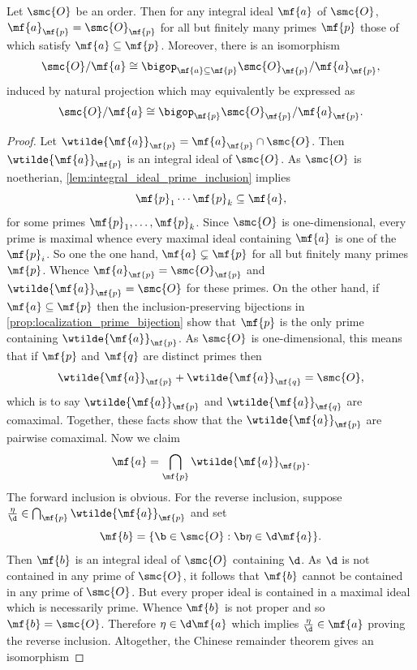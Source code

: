 \documentclass[12pt]{article}
\begin{document}
      \begin{proposition}\label{prop:localized_Chinese_remainder_theorem}
        Let \(\smc{O}\) be an order. Then for any integral ideal \(\mf{a}\) of \(\smc{O}\), \(\mf{a}_{\mf{p}} = \smc{O}_{\mf{p}}\) for all but finitely many primes \(\mf{p}\) those of which satisfy \(\mf{a} \subseteq \mf{p}\). Moreover, there is an isomorphism
        \[
          \smc{O}/\mf{a} \cong \bigop_{\mf{a} \subseteq \mf{p}}\smc{O}_{\mf{p}}/\mf{a}_{\mf{p}},
        \]
        induced by natural projection which may equivalently be expressed as
        \[
          \smc{O}/\mf{a} \cong \bigop_{\mf{p}}\smc{O}_{\mf{p}}/\mf{a}_{\mf{p}}.
        \]
      \end{proposition}
      \begin{proof}
        Let \(\wtilde{\mf{a}}_{\mf{p}} = \mf{a}_{\mf{p}} \cap \smc{O}\). Then \(\wtilde{\mf{a}}_{\mf{p}}\) is an integral ideal of \(\smc{O}\). As \(\smc{O}\) is noetherian, \cref{lem:integral_ideal_prime_inclusion} implies
        \[
          \mf{p}_{1} \cdots \mf{p}_{k} \subseteq \mf{a},
        \]
        for some primes \(\mf{p}_{1},\ldots,\mf{p}_{k}\). Since \(\smc{O}\) is one-dimensional, every prime is maximal whence every maximal ideal containing \(\mf{a}\) is one of the \(\mf{p}_{i}\). So one the one hand, \(\mf{a} \subsetneq \mf{p}\) for all but finitely many primes \(\mf{p}\). Whence \(\mf{a}_{\mf{p}} = \smc{O}_{\mf{p}}\) and \(\wtilde{\mf{a}}_{\mf{p}} = \smc{O}\) for these primes. On the other hand, if \(\mf{a} \subseteq \mf{p}\) then the inclusion-preserving bijections in \cref{prop:localization_prime_bijection} show that \(\mf{p}\) is the only prime containing \(\wtilde{\mf{a}}_{\mf{p}}\). As \(\smc{O}\) is one-dimensional, this means that if \(\mf{p}\) and \(\mf{q}\) are distinct primes then
        \[
          \wtilde{\mf{a}}_{\mf{p}}+\wtilde{\mf{a}}_{\mf{q}} = \smc{O},
        \]
        which is to say \(\wtilde{\mf{a}}_{\mf{p}}\) and \(\wtilde{\mf{a}}_{\mf{q}}\) are comaximal. Together, these facts show that the \(\wtilde{\mf{a}}_{\mf{p}}\) are pairwise comaximal. Now we claim
        \[
          \mf{a} = \bigcap_{\mf{p}}\wtilde{\mf{a}}_{\mf{p}}.
        \]
        The forward inclusion is obvious. For the reverse inclusion, suppose \(\frac{\eta}{\d} \in \bigcap_{\mf{p}}\wtilde{\mf{a}}_{\mf{p}}\) and set
        \[
          \mf{b} = \{\b \in \smc{O}:\b\eta \in \d\mf{a}\}.
        \]
        Then \(\mf{b}\) is an integral ideal of \(\smc{O}\) containing \(\d\). As \(\d\) is not contained in any prime of \(\smc{O}\), it follows that \(\mf{b}\) cannot be contained in any prime of \(\smc{O}\). But every proper ideal is contained in a maximal ideal which is necessarily prime. Whence \(\mf{b}\) is not proper and so \(\mf{b} = \smc{O}\). Therefore \(\eta \in \d\mf{a}\) which implies \(\frac{\eta}{\d} \in \mf{a}\) proving the reverse inclusion. Altogether, the Chinese remainder theorem gives an isomorphism

\end{proof}
\end{document}
